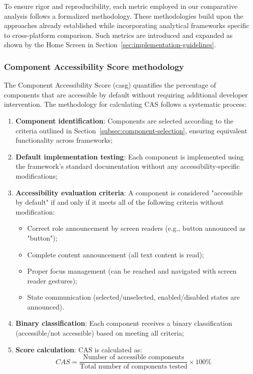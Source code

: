 To ensure rigor and reproducibility, each metric employed in our comparative analysis follows a formalized methodology. These methodologies build upon the approaches already established while incorporating analytical frameworks specific to cross-platform comparison. Such metrics are introduced and expanded as shown by the Home Screen in Section~\ref{sec:implementation-guidelines}.

\subsubsection{Component Accessibility Score methodology}
\label{subsubsec:cas-methodology}

The Component Accessibility Score (\gls{casg}) quantifies the percentage of components that are accessible by default without requiring additional developer intervention. The methodology for calculating CAS follows a systematic process:

\begin{enumerate}
    \item \textbf{Component identification}: Components are selected according to the criteria outlined in Section~\ref{subsec:component-selection}, ensuring equivalent functionality across frameworks;
    
    \item \textbf{Default implementation testing}: Each component is implemented using the framework's standard documentation without any accessibility-specific modifications;
    
    \item \textbf{Accessibility evaluation criteria}: A component is considered "accessible by default" if and only if it meets all of the following criteria without modification:
    \begin{itemize}
        \item Correct role announcement by screen readers (e.g., button announced as "button");
        \item Complete content announcement (all text content is read);
        \item Proper focus management (can be reached and navigated with screen reader gestures);
        \item State communication (selected/unselected, enabled/disabled states are announced).
    \end{itemize}
    
    \item \textbf{Binary classification}: Each component receives a binary classification (accessible/not accessible) based on meeting all criteria;
    
    \item \textbf{Score calculation}: CAS is calculated as:
    \begin{equation}
    CAS = \frac{\text{Number of accessible components}}{\text{Total number of components tested}} \times 100\%
    \end{equation}
\end{enumerate}

